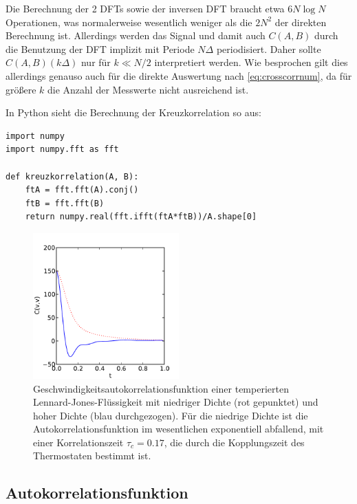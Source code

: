 Die Berechnung der 2 DFTs sowie der inversen DFT braucht etwa $6 N\log
N$ Operationen, was normalerweise wesentlich weniger als die $2N^2$
der direkten Berechnung ist.  Allerdings werden das Signal und damit
auch $C(A,B)$ durch die Benutzung der DFT implizit mit Periode
$N\Delta$ periodisiert. Daher sollte $C(A,B)(k\Delta)$ nur für $k\ll
N/2$ interpretiert werden. Wie besprochen gilt dies allerdings genauso
auch für die direkte Auswertung nach \eqref{eq:crosscorrnum}, da für
größere $k$ die Anzahl der Messwerte nicht ausreichend ist.

In Python sieht die Berechnung der Kreuzkorrelation so aus:
\begin{lstlisting}
import numpy
import numpy.fft as fft

def kreuzkorrelation(A, B):
    ftA = fft.fft(A).conj()
    ftB = fft.fft(B)
    return numpy.real(fft.ifft(ftA*ftB))/A.shape[0]
\end{lstlisting}

\begin{figure}
  \centering
  \includegraphics[width=0.5\textwidth]{plots/v_ac}
  \caption{Geschwindigkeitsautokorrelationsfunktion einer temperierten
    Lennard-Jones-Flüs\-sig\-ke\-it mit niedriger Dichte (rot
    gepunktet) und hoher Dichte (blau durchgezogen). Für die niedrige
    Dichte ist die Autokorrelationsfunktion im wesentlichen
    exponentiell abfallend, mit einer Korrelationszeit $\tau_c=0.17$,
    die durch die Kopplungszeit des Thermostaten bestimmt ist.}
  \label{fig:vac}
\end{figure}

\subsection{Autokorrelationsfunktion}


